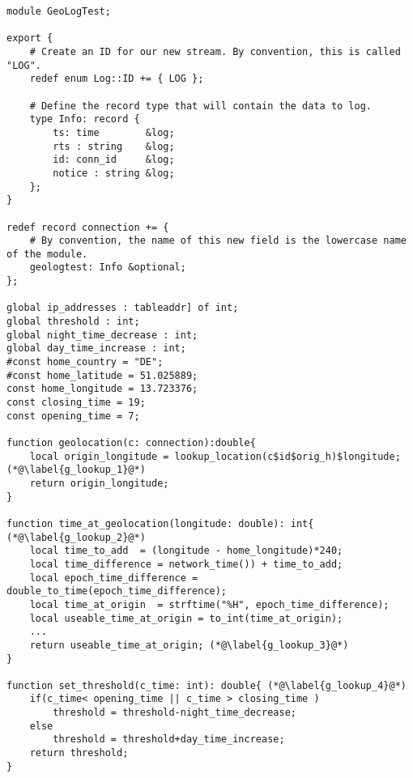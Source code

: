 \begin{lstlisting}[caption={Geolocation und Setzen des Grenzwertes},firstline=31,firstnumber=31,linerange={31-37,42-54}]
module GeoLogTest;

export {
    # Create an ID for our new stream. By convention, this is called "LOG".
    redef enum Log::ID += { LOG };

    # Define the record type that will contain the data to log.
    type Info: record {
        ts: time        &log;
        rts : string 	&log;
        id: conn_id     &log; 
        notice : string &log;
    };
}

redef record connection += {
    # By convention, the name of this new field is the lowercase name of the module.
    geologtest: Info &optional;
};

global ip_addresses : tableaddr] of int;
global threshold : int; 
global night_time_decrease : int;
global day_time_increase : int;
#const home_country = "DE";
#const home_latitude = 51.025889;
const home_longitude = 13.723376;
const closing_time = 19;
const opening_time = 7;

function geolocation(c: connection):double{
	local origin_longitude = lookup_location(c$id$orig_h)$longitude;(*@\label{g_lookup_1}@*)
	return origin_longitude;
}

function time_at_geolocation(longitude: double): int{ (*@\label{g_lookup_2}@*)
	local time_to_add  = (longitude - home_longitude)*240;
	local time_difference = network_time()) + time_to_add;
	local epoch_time_difference = double_to_time(epoch_time_difference);
	local time_at_origin  = strftime("%H", epoch_time_difference);
	local useable_time_at_origin = to_int(time_at_origin);
	...	
	return useable_time_at_origin; (*@\label{g_lookup_3}@*)
}

function set_threshold(c_time: int): double{ (*@\label{g_lookup_4}@*)
	if(c_time< opening_time || c_time > closing_time )
		threshold = threshold-night_time_decrease;
	else 
		threshold = threshold+day_time_increase;
	return threshold; 
}
\end{lstlisting}

